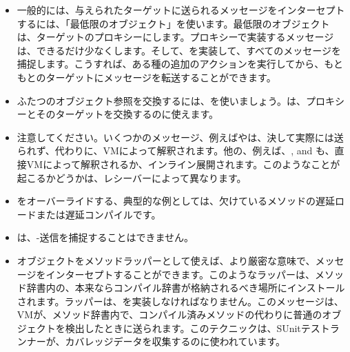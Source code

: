 \documentclass[a4paper,10pt,twoside]{book}
\begin{document}
\begin{itemize}
\item 一般的には、与えられたターゲットに送られるメッセージをインターセプトするには、「最低限のオブジェクト」を使います。最低限のオブジェクトは、ターゲットのプロキシーにします。プロキシーで実装するメッセージは、できるだけ少なくします。そして、を実装して、すべてのメッセージを捕捉します。こうすれば、ある種の追加のアクションを実行してから、もともとのターゲットにメッセージを転送することができます。
\item ふたつのオブジェクト参照を交換するには、を使いましょう。は、プロキシーとそのターゲットを交換するのに使えます。
\item 注意してください。いくつかのメッセージ、例えばやは、決して実際には送られず、代わりに、VMによって解釈されます。他の、例えば、\ct{+}, \ct{-} and  も、直接VMによって解釈されるか、インライン展開されます。このようなことが起こるかどうかは、レシーバーによって異なります。%
\item {}をオーバーライドする、典型的な例としては、欠けているメソッドの遅延ロードまたは遅延コンパイルです。
\item {}は、\self-送信を捕捉することはできません。
\item オブジェクトをメソッドラッパーとして使えば、より厳密な意味で、メッセージをインターセプトすることができます。このようなラッパーは、メソッド辞書内の、本来ならコンパイル辞書が格納されるべき場所にインストールされます。ラッパーは、を実装しなければなりません。このメッセージは、VMが、メソッド辞書内で、コンパイル済みメソッドの代わりに普通のオブジェクトを検出したときに送られます。このテクニックは、SUnitテストランナーが、カバレッジデータを収集するのに使われています。%
\end{itemize}

\ifx\wholebook\relax\else
   
   
\end{document}
